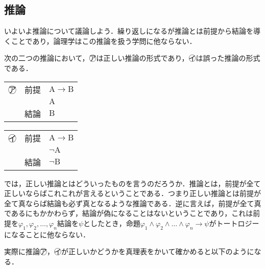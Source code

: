 \documentclass[10pt,b5paper,papersize,dvipdfmx]{jsbook}
\newcommand\rmA{\mathrm{A}}
\newcommand\rmB{\mathrm{B}}
\newcommand\maru[1]{\textcircled{\scriptsize{}#1}}
\begin{document}
\subsection{推論}
いよいよ推論について議論しよう．繰り返しになるが推論とは前提から結論を導くことであり，論理学はこの推論を扱う学問に他ならない．\par
次の二つの推論において，\maru{ア}は正しい推論の形式であり，\maru{イ}は誤った推論の形式である．
\begin{table}[H]
  \begin{minipage}[t]{.45\textwidth}
    \centering
    \begin{tabular}{lll}
      \maru{ア} & 前提 & $\rmA \to \rmB$ \\
                &     & $\rmA$ \\ \hline
                & 結論 & $\rmB$ \\
    \end{tabular}
  \end{minipage}
  \hfill
  \begin{minipage}[t]{.45\textwidth}
    \centering
    \begin{tabular}{lll}
      \maru{イ} & 前提 & $\rmA \to \rmB$ \\
                &     & $\lnot \rmA$ \\ \hline
                & 結論 & $\lnot \rmB$ \\
    \end{tabular}
  \end{minipage}
\end{table}
では，正しい推論とはどういったものを言うのだろうか．推論とは，前提が全て正しいならばこれこれが言えるということである．つまり正しい推論とは前提が全て真ならば結論も必ず真となるような推論である．逆に言えば，前提が全て真であるにもかかわらず，結論が偽になることはないということであり，これは前提を$\varphi_1,\varphi_2,\dots,\varphi_n$結論を$\psi$としたとき，命題$\varphi_1\land\varphi_2\land \dots \land\varphi_n\to\psi$がトートロジーになることに他ならない．\par
実際に推論\maru{ア}，\maru{イ}が正しいかどうかを真理表をかいて確かめると以下のようになる．
\end{document}
